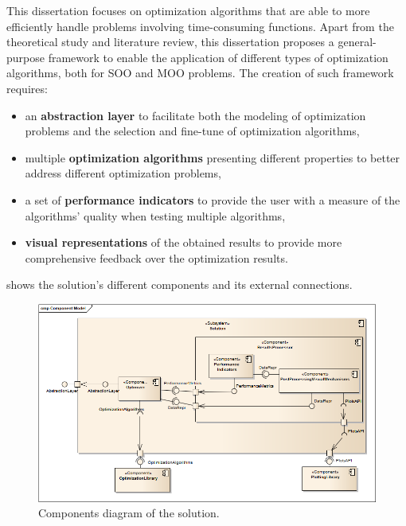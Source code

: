 \label{chap:architecture}

This dissertation focuses on optimization algorithms that are able to more efficiently handle problems involving time-consuming functions. Apart from the theoretical study and literature review, this dissertation proposes a general-purpose framework to enable the application of different types of optimization algorithms, both for \ac{SOO} and \ac{MOO} problems. The creation of such framework requires: 
\begin{itemize}
	\item an \textbf{abstraction layer} to facilitate both the modeling of optimization problems and the selection and fine-tune of optimization algorithms,
	\item multiple \textbf{optimization algorithms} presenting different properties to better address different optimization problems,
	\item a set of \textbf{performance indicators} to provide the user with a measure of the algorithms' quality when testing multiple algorithms,
	\item \textbf{visual representations} of the obtained results to provide more comprehensive feedback over the optimization results.
\end{itemize}
 shows the  solution's different components and its external connections.

\begin{figure}[htbp]
	\centering
	\includegraphics[width=\textwidth]{./Images/Solution/ComponentModel3.png}
	\caption[Components diagram of the solution]{Components diagram of the solution.}
	\label{fig:solution}
\end{figure}

